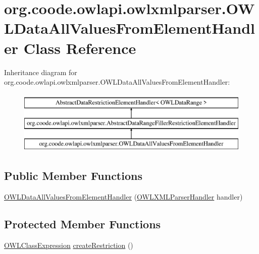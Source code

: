\hypertarget{classorg_1_1coode_1_1owlapi_1_1owlxmlparser_1_1_o_w_l_data_all_values_from_element_handler}{\section{org.\-coode.\-owlapi.\-owlxmlparser.\-O\-W\-L\-Data\-All\-Values\-From\-Element\-Handler Class Reference}
\label{classorg_1_1coode_1_1owlapi_1_1owlxmlparser_1_1_o_w_l_data_all_values_from_element_handler}
}
Inheritance diagram for org.\-coode.\-owlapi.\-owlxmlparser.\-O\-W\-L\-Data\-All\-Values\-From\-Element\-Handler\-:\begin{figure}[H]
\begin{center}
\leavevmode
\includegraphics[height=3.000000cm]{classorg_1_1coode_1_1owlapi_1_1owlxmlparser_1_1_o_w_l_data_all_values_from_element_handler}
\end{center}
\end{figure}
\subsection*{Public Member Functions}
\begin{DoxyCompactItemize}
\item 
\hyperlink{classorg_1_1coode_1_1owlapi_1_1owlxmlparser_1_1_o_w_l_data_all_values_from_element_handler_a2a20e53766109eddd4fca0f1a7dc78f8}{O\-W\-L\-Data\-All\-Values\-From\-Element\-Handler} (\hyperlink{classorg_1_1coode_1_1owlapi_1_1owlxmlparser_1_1_o_w_l_x_m_l_parser_handler}{O\-W\-L\-X\-M\-L\-Parser\-Handler} handler)
\end{DoxyCompactItemize}
\subsection*{Protected Member Functions}
\begin{DoxyCompactItemize}
\item 
\hyperlink{interfaceorg_1_1semanticweb_1_1owlapi_1_1model_1_1_o_w_l_class_expression}{O\-W\-L\-Class\-Expression} \hyperlink{classorg_1_1coode_1_1owlapi_1_1owlxmlparser_1_1_o_w_l_data_all_values_from_element_handler_a838425a6c8aed79297844885154cf51f}{create\-Restriction} ()
\end{DoxyCompactItemize}


